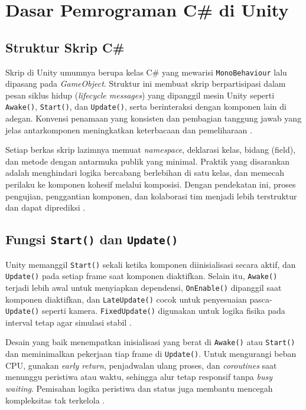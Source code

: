\documentclass[../main.tex]{subfiles}
\begin{document}
\chapter{Dasar Pemrograman C\# di Unity}

\section{Struktur Skrip C\#}
Skrip di Unity umumnya berupa kelas C\# yang mewarisi \texttt{MonoBehaviour} lalu dipasang pada \textit{GameObject}. Struktur ini membuat skrip berpartisipasi dalam pesan siklus hidup (\textit{lifecycle messages}) yang dipanggil mesin Unity seperti \texttt{Awake()}, \texttt{Start()}, dan \texttt{Update()}, serta berinteraksi dengan komponen lain di adegan. Konvensi penamaan yang konsisten dan pembagian tanggung jawab yang jelas antarkomponen meningkatkan keterbacaan dan pemeliharaan \parencite{mslearn-csharp-guide,unity-execution-order}.

Setiap berkas skrip lazimnya memuat \textit{namespace}, deklarasi kelas, bidang (field), dan metode dengan antarmuka publik yang minimal. Praktik yang disarankan adalah menghindari logika bercabang berlebihan di satu kelas, dan memecah perilaku ke komponen kohesif melalui komposisi. Dengan pendekatan ini, proses pengujian, penggantian komponen, dan kolaborasi tim menjadi lebih terstruktur dan dapat diprediksi \parencite{mslearn-csharp-guide}.

\section{Fungsi \texttt{Start()} dan \texttt{Update()}}
Unity memanggil \texttt{Start()} sekali ketika komponen diinisialisasi secara aktif, dan \texttt{Update()} pada setiap frame saat komponen diaktifkan. Selain itu, \texttt{Awake()} terjadi lebih awal untuk menyiapkan dependensi, \texttt{OnEnable()} dipanggil saat komponen diaktifkan, dan \texttt{LateUpdate()} cocok untuk penyesuaian pasca-\texttt{Update()} seperti kamera. \texttt{FixedUpdate()} digunakan untuk logika fisika pada interval tetap agar simulasi stabil \parencite{unity-scripting-start-update,unity-execution-order}.

Desain yang baik menempatkan inisialisasi yang berat di \texttt{Awake()} atau \texttt{Start()} dan meminimalkan pekerjaan tiap frame di \texttt{Update()}. Untuk mengurangi beban CPU, gunakan \textit{early return}, penjadwalan ulang proses, dan \textit{coroutines} saat menunggu peristiwa atau waktu, sehingga alur tetap responsif tanpa \textit{busy waiting}. Pemisahan logika peristiwa dan status juga membantu mencegah kompleksitas tak terkelola \parencite{unity-scripting-start-update,unity-coroutines}.
\end{document}
